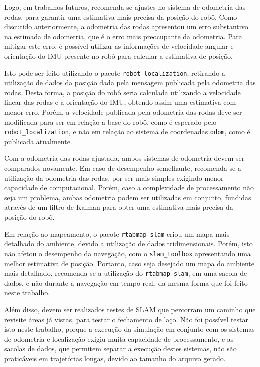 \documentclass[repeatfields,xlists,xpacks,oneside,yearsonly]{ufrgscca}
\begin{document}
Logo, em trabalhos futuros, recomenda-se ajustes no sistema de
odometria das rodas, para garantir uma estimativa mais precisa da
posição do robô. Como discutido anteriormente, a odometria das rodas
apresentou um erro substantivo na estimada de odometria, que é o erro
mais preocupante da odometria. Para mitigar este erro, é possível
utilizar as informações de velocidade angular e orientação do IMU
presente no robô para calcular a estimativa de posição.

Isto pode ser feito utilizando o pacote \texttt{robot\_localization},
retirando a utilização de dados da posição dada pela mensagem
publicada pela odometria das rodas. Desta forma, a posição do robô
seria calculada utilizando a velocidade linear das rodas e a
orientação do IMU, obtendo assim uma estimativa com menor erro.
Porém, a velocidade publicada pela odometria das rodas deve ser
modificada para ser em relação a base do robô, como é esperado pelo
\texttt{robot\_localization}, e não em relação ao sistema de
coordenadas \texttt{odom}, como é publicada atualmente.

Com a odometria das rodas ajustada, ambos sistemas de odometria devem
ser comparados novamente. Em caso de desempenho semelhante,
recomenda-se a utilização da odometria das rodas, por ser mais
simples exigindo menor capacidade de computacional. Porém, caso a
complexidade de processamento não seja um problema, ambas odometria
podem ser utilizadas em conjunto, fundidas através de um filtro de
Kalman para obter uma estimativa mais precisa da posição do robô.

Em relação ao mapeamento, o pacote \texttt{rtabmap\_slam} criou um
mapa mais detalhado do ambiente, devido a utilização de dados
tridimensionais. Porém, isto não afetou o desempenho da navegação,
com o \texttt{slam\_toolbox} apresentando uma melhor estimativa de
posição. Portanto, caso seja desejado um mapa do ambiente mais
detalhado, recomenda-se a utilização do \texttt{rtabmap\_slam}, em
uma sacola de dados, e não durante a navegação em tempo-real, da
mesma forma que foi feito neste trabalho.

Além disso, devem ser realizados testes de SLAM que percorram um
caminho que revisite áreas já vistas, para testar o fechamento de
laço. Não foi possível testar isto neste trabalho, porque a execução
da simulação em conjunto com os sistemas de odometria e localização
exigiu muita capacidade de processamento, e as sacolas de dados, que
permitem separar a execução destes sistemas, não são praticáveis em
trajetórias longas, devido ao tamanho do arquivo gerado.
\end{document}
